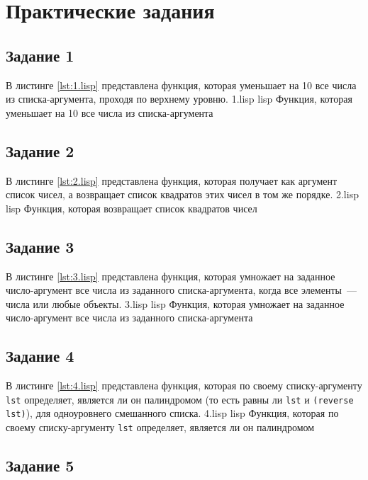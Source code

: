\chapter{Практические задания}

\section{Задание 1}

В листинге \ref{lst:1.lisp} представлена функция, которая уменьшает на 10 все числа из списка-аргумента, проходя по верхнему уровню.
	{1.lisp}
	{lisp}
	{Функция, которая уменьшает на 10 все числа из списка-аргумента}

\section{Задание 2}

В листинге \ref{lst:2.lisp} представлена функция, которая получает как аргумент список чисел, а возвращает список квадратов этих чисел в том же порядке.
	{2.lisp}
	{lisp}
	{Функция, которая возвращает список квадратов чисел}

\section{Задание 3}

В листинге \ref{lst:3.lisp} представлена функция, которая умножает на заданное число-аргумент все числа из заданного списка-аргумента, когда все элементы~--- числа или любые объекты.
	{3.lisp}
	{lisp}
	{Функция, которая умножает на заданное число-аргумент все числа из заданного списка-аргумента}

\section{Задание 4}

В листинге \ref{lst:4.lisp} представлена функция, которая по своему списку-аргументу \texttt{lst} определяет, является ли он палиндромом (то есть равны ли \texttt{lst} и \texttt{(reverse lst)}), для одноуровнего смешанного списка.
	{4.lisp}
	{lisp}
	{Функция, которая по своему списку-аргументу \texttt{lst} определяет, является ли он палиндромом}

\section{Задание 5}

